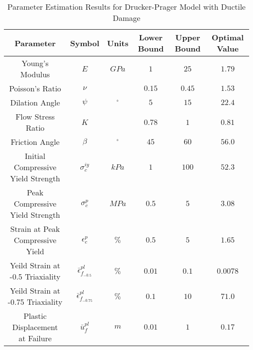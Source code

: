 \begin{table}[!htbp]
\centering
\caption{Parameter Estimation Results for Drucker-Prager Model with Ductile Damage}
\label{tab:paramDrucker}
\begin{tabular}{@{}cccccc@{}}
\toprule
Parameter                                  & Symbol                            & Units      & Lower Bound & Upper Bound & Optimal Value \\ \midrule
Young's Modulus                            & $E$                               & $GPa$      & $1$         & $25$        & $1.79$        \\
Poisson's Ratio                            & $\nu$                             &            & $0.15$      & $0.45$      & $1.53$        \\
Dilation Angle                             & $\psi$                            & $^{\circ}$ & $5$         & $15$        & $22.4$        \\
Flow Stress Ratio                          & $K$                               &            & $0.78$      & $1$         & $0.81$        \\
Friction Angle                             & $\beta$                           & $^{\circ}$ & $45$        & $60$        & $56.0$        \\
Initial Compressive Yield Strength         & $\sigma_c^{iy}$                   & $kPa$      & $1$         & $100$       & $52.3$        \\
Peak Compressive Yield Strength  & $\sigma_c^{p}$                    & $MPa$      & $0.5$       & $5$         & $3.08$        \\
Strain at Peak Compressive Yield           & $\epsilon_c^{p}$                 & $\%$       & $0.5$       & $5$         & $1.65$        \\
Yeild Strain at -0.5 Triaxiality           & $\bar{\epsilon}^{pl}_{f_{-0.5}}$  & $\%$       & $0.01$      & $0.1$       & $0.0078$       \\
Yeild Strain at -0.75 Triaxiality          & $\bar{\epsilon}^{pl}_{f_{-0.75}}$ & $\%$       & $0.1$       & $10$        & $71.0$        \\
Plastic Displacement at Failure            & $\bar{u}^{pl}_f$                  & $m$        & $0.01$      & $1$         & $0.17$      \\ \bottomrule
\end{tabular}
\end{table}

